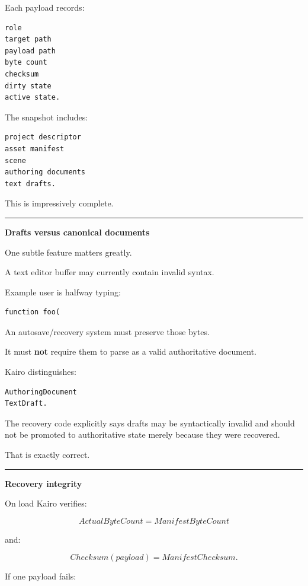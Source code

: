 Each payload records:

\begin{verbatim}
role
target path
payload path
byte count
checksum
dirty state
active state.
\end{verbatim}

The snapshot includes:

\begin{verbatim}
project descriptor
asset manifest
scene
authoring documents
text drafts.
\end{verbatim}

This is impressively complete.

\begin{center}\rule{0.5\linewidth}{0.5pt}\end{center}

\textbf{Drafts versus canonical documents}

One subtle feature matters greatly.

A text editor buffer may currently contain invalid syntax.

Example user is halfway typing:

\begin{verbatim}
function foo(
\end{verbatim}

An autosave/recovery system must preserve those bytes.

It must \textbf{not} require them to parse as a valid authoritative document.

Kairo distinguishes:

\begin{verbatim}
AuthoringDocument
TextDraft.
\end{verbatim}

The recovery code explicitly says drafts may be syntactically invalid and should not be promoted to authoritative state merely because they were recovered.

That is exactly correct.

\begin{center}\rule{0.5\linewidth}{0.5pt}\end{center}

\textbf{Recovery integrity}

On load Kairo verifies:

\[
ActualByteCount=
ManifestByteCount
\]

and:

\[
Checksum(payload)=
ManifestChecksum.
\]

If one payload fails:

